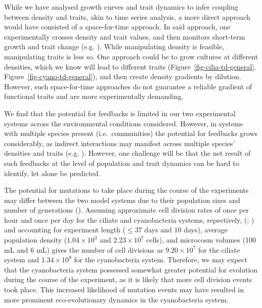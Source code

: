 \documentclass[
  letterpaper,
  DIV=11,
  numbers=noendperiod]{scrartcl}
\begin{document}
While we have analysed growth curves and trait dynamics to infer
coupling between density and traits, akin to time series analysis, a
more direct approach would have consisted of a space-for-time approach.
In said approach, one experimentally crosses density and trait values,
and then monitors short-term growth and trait change (e.g.
). While
manipulating density is feasible, manipulating traits is less so. One
approach could be to grow cultures at different densities, which we know
will lead to different traits (Figure~\ref{fig-cilia-td-general},
Figure~\ref{fig-cyano-td-general}), and then create density gradients by
dilution. However, such space-for-time approaches do not guarantee a
reliable gradient of functional traits and are more experimentally
demanding.

We find that the potential for feedbacks is limited in our two
experimental systems across the environmental conditions considered.
However, in systems with multiple species present (i.e.~communities) the
potential for feedbacks grows considerably, as indirect interactions may
manifest across multiple species' densities and traits (e.g.
). However, one challenge
will be that the net result of such feedbacks at the level of population
and trait dynamics can be hard to identify, let alone be predicted.

The potential for mutations to take place during the course of the
experiments may differ between the two model systems due to their
population sizes and number of generations
(). Assuming
approximate cell division rates of once per hour and once per day for
the ciliate and cyanobacteria systems, repectively,
(;
) and accounting for
experiment length (\(\leq 37\) days and \(10\) days), average population
density (\(1.04 \times 10^{3}\) and \(2.23 \times 10^{7}\) cells), and
microcosm volumes (100 mL and 6 mL) gives the number of cell divisions
as \(9.20 \times 10^{7}\) for the ciliate system and
\(1.34 \times 10^{9}\) for the cyanobacteria system. Therefore, we may
expect that the cyanobacteria system possessed somewhat greater
potential for evolution during the course of the experiment, as it is
likely that more cell division events took place. This increased
likelihood of mutation events may have resulted in more prominent
eco-evolutionary dynamics in the cyanobacteria system.
\end{document}
